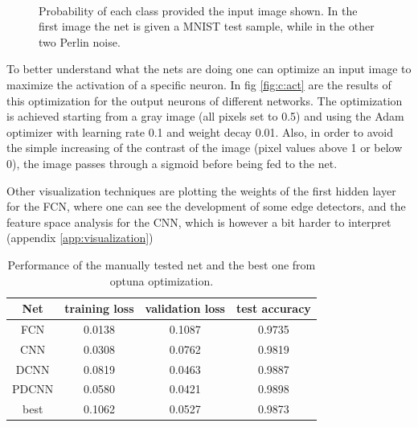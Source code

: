 \documentclass[a4paper, 11pt]{article}
\begin{document}
    \begin{figure}
      \centering
       \,
       \,
      \caption{Probability of each class provided the input image shown. In the first image the net is given a MNIST test sample, while in the other two Perlin noise.}
      \label{fig:c:ptest}
    \end{figure}

    To better understand what the nets are doing one can optimize an input image to maximize the activation of a specific neuron. In fig \ref{fig:c:act} are the results of this optimization for the output neurons of different networks. The optimization is achieved starting from a gray image (all pixels set to 0.5) and using the Adam optimizer with learning rate 0.1 and weight decay 0.01. Also, in order to avoid the simple increasing of the contrast of the image (pixel values above 1 or below 0), the image passes through a sigmoid before being fed to the net.

    Other visualization techniques are plotting the weights of the first hidden layer for the FCN, where one can see the development of some edge detectors, and the feature space analysis for the CNN, which is however a bit harder to interpret (appendix \ref{app:visualization})

    \begin{table}[H]
      \centering
      \begin{tabular}{c|ccc}
        Net & training loss & validation loss & test accuracy \\
        \midrule
        FCN & 0.0138 & 0.1087 & 0.9735 \\
        CNN & 0.0308 & 0.0762 & 0.9819 \\
        DCNN & 0.0819 & 0.0463 & 0.9887 \\
        PDCNN & 0.0580 & 0.0421 & 0.9898 \\
        \midrule
        best & 0.1062 & 0.0527 & 0.9873
      \end{tabular}
      \caption{Performance of the manually tested net and the best one from optuna optimization.}
      \label{tab:c:losses}
    \end{table}
\end{document}
